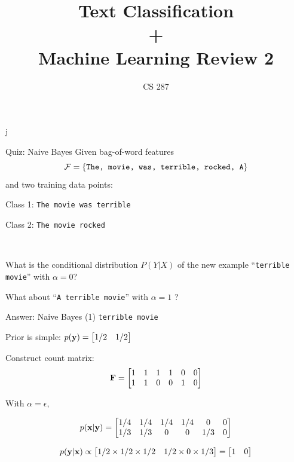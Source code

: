 \documentclass{beamer}
\title{Text Classification\\ + \\ Machine Learning Review 2 }
\date{}
\author{CS 287}
\begin{document}
\begin{frame}
  \titlepage
\end{frame}

j

\begin{frame}{Quiz: Naive Bayes}
  Given bag-of-word features \[\mathcal{F} = \{\mathrm{\texttt{The, movie, was, terrible, rocked, A}} \}\] and two training data points:

  \begin{center}
    Class 1: \texttt{The movie was terrible}

    Class 2: \texttt{The movie rocked}
  \end{center}
  \\

  \air

  What is the conditional distribution $P(Y | X)$ of the new example ``\texttt{terrible movie}''  with $\alpha =0$?
  \air

  What about ``\texttt{A terrible movie}'' with $\alpha =1$ ?
\end{frame}

\begin{frame}{Answer: Naive Bayes (1) }
  \texttt{terrible movie}
  \air

  Prior is simple: $p(\mathbf{y}) =  \begin{bmatrix} 1/2 & 1/2 \end{bmatrix}$

  Construct count matrix:
  \[ \mathbf{F} =
    \begin{bmatrix}
      1 & 1 & 1 & 1 & 0 & 0 \\
      1 & 1 & 0 & 0 & 1 & 0 \\
    \end{bmatrix}
  \]

  With $\alpha = \epsilon$,

  \[ p(\mathbf{x} | \mathbf{y}) =     \begin{bmatrix}
      1/4 & 1/4 & 1/4 & 1/4 & 0 & 0 \\
      1/3 & 1/3 & 0 & 0 & 1/3 & 0 \\
    \end{bmatrix}
  \]

  \[ p(\mathbf{y} | \mathbf{x}) \propto \begin{bmatrix} 1/2 \times 1/2 \times 1/2 &  1/2 \times 0 \times 1/3  \end{bmatrix} = \begin{bmatrix} 1 &  0 \end{bmatrix}  \]

\end{frame}
\end{document}
